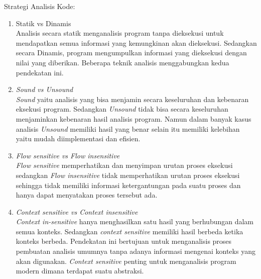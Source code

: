 Strategi Analisis Kode:
\begin{enumerate}[leftmargin=1.3cm]
	\item Statik vs Dinamis\\
	Analisis secara statik menganalisis program tanpa dieksekusi untuk mendapatkan semua informasi yang kemungkinan akan dieksekusi. Sedangkan secara Dinamis, program mengumpulkan informasi yang dieksekusi dengan nilai yang diberikan. Beberapa teknik analisis menggabungkan kedua pendekatan ini.
	\item \textit{Sound vs Unsound}\\
	\textit{Sound} yaitu analisis yang bisa menjamin secara keseluruhan dan kebenaran eksekusi program. Sedangkan \textit{Unsound} tidak bisa secara keseluruhan menjaminkan kebenaran hasil analisis program. Namun dalam banyak kasus analisis \textit{Unsound} memiliki hasil yang benar selain itu memiliki kelebihan yaitu mudah diimplementasi dan efisien.
	\item \textit{Flow sensitive vs Flow insensitive}\\
	\textit{Flow sensitive} memperhatikan dan menyimpan urutan proses eksekusi sedangkan \textit{Flow insensitive} tidak memperhatikan urutan proses eksekusi sehingga tidak memiliki informasi ketergantungan pada suatu proses dan hanya dapat menyatakan proses tersebut ada.
	\item \textit{Context sensitive vs Context insensitive}\\
	\textit{Context in-sensitive} hanya menghasilkan satu hasil yang berhubungan dalam semua konteks. Sedangkan \textit{context sensitive} memiliki hasil berbeda ketika konteks berbeda. Pendekatan ini bertujuan untuk menganalisis proses pembuatan analisis umumnya tanpa adanya informasi mengenai konteks yang akan digunakan. \textit{Context sensitive} penting untuk menganalisis program modern dimana terdapat suatu abstraksi.
\end{enumerate}

